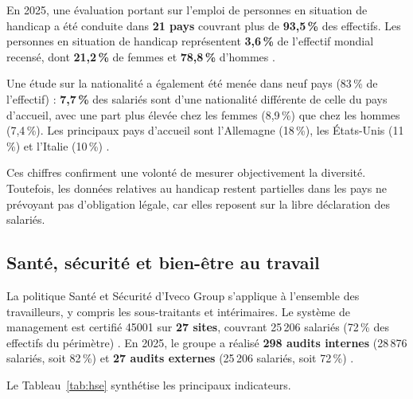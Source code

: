 En 2025, une évaluation portant sur l'emploi de personnes en situation de handicap a été conduite dans \textbf{21 pays} couvrant plus de \textbf{93,5\,\%} des effectifs. Les personnes en situation de handicap représentent \textbf{3,6\,\%} de l'effectif mondial recensé, dont \textbf{21,2\,\%} de femmes et \textbf{78,8\,\%} d'hommes \cite{iveco_annual_2025}.

Une étude sur la nationalité a également été menée dans neuf pays (83\,\% de l'effectif) : \textbf{7,7\,\%} des salariés sont d'une nationalité différente de celle du pays d'accueil, avec une part plus élevée chez les femmes (8,9\,\%) que chez les hommes (7,4\,\%). Les principaux pays d'accueil sont l'Allemagne (18\,\%), les États-Unis (11\,\%) et l'Italie (10\,\%) \cite{iveco_annual_2025}.

Ces chiffres confirment une volonté de mesurer objectivement la diversité. Toutefois, les données relatives au handicap restent partielles dans les pays ne prévoyant pas d'obligation légale, car elles reposent sur la libre déclaration des salariés.

\subsection{Santé, sécurité et bien-être au travail}

La politique Santé et Sécurité d'Iveco Group s'applique à l'ensemble des travailleurs, y compris les sous-traitants et intérimaires. Le système de management est certifié  45001 sur \textbf{27 sites}, couvrant 25\,206 salariés (72\,\% des effectifs du périmètre) \cite{iveco_annual_2025}. En 2025, le groupe a réalisé \textbf{298 audits internes} (28\,876 salariés, soit 82\,\%) et \textbf{27 audits externes} (25\,206 salariés, soit 72\,\%) \cite{iveco_annual_2025}.

Le Tableau~\ref{tab:hse} synthétise les principaux indicateurs.

